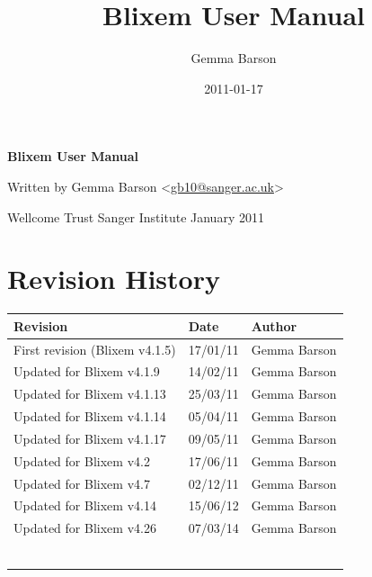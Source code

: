 \documentclass[letterpaper]{article}
\title{Blixem User Manual}
\author{Gemma Barson}
\date{2011-01-17}
\begin{document}
\setcounter{page}{1}\pagestyle{Standard}


\thispagestyle{FirstPage}
{\centering\sffamily\bfseries\color[rgb]{0.0,0.27058825,0.5254902}
\Huge\bf{Blixem User Manual}}

\bigskip

{\centering
\large{Written by Gemma Barson}}
{\centering
{\textless}\href{mailto:gb10@sanger.ac.uk}{gb10@sanger.ac.uk}{\textgreater}}

\bigskip

{\centering
\large{Wellcome Trust Sanger Institute}}
{ January 2011}



\clearpage
{\color[rgb]{0.0,0.27058825,0.5254902}\section[Revision History]{Revision History}}
\hypertarget{RefHeading334316266717}{}

\begin{center}
\tablehead{}
\begin{supertabular}{|m{8.073cm}|m{3.2849998cm}|m{3.282cm}|}
\hline
\bfseries Revision &
\bfseries Date &
\bfseries Author\\\hline
 First revision (Blixem v4.1.5) &
 17/01/11 &
 Gemma Barson\\\hline
 Updated for Blixem v4.1.9 &
 14/02/11 &
 Gemma Barson\\\hline
 Updated for Blixem v4.1.13 &
 25/03/11 &
 Gemma Barson\\\hline
 Updated for Blixem v4.1.14 &
 05/04/11 &
 Gemma Barson\\\hline
 Updated for Blixem v4.1.17 &
 09/05/11 &
 Gemma Barson\\\hline
 Updated for Blixem v4.2 &
 17/06/11 &
 Gemma Barson\\\hline
 Updated for Blixem v4.7 &
 02/12/11 &
 Gemma Barson\\\hline
 Updated for Blixem v4.14 &
 15/06/12 &
 Gemma Barson\\\hline
 Updated for Blixem v4.26  &
 07/03/14 &
 Gemma Barson\\\hline
 &
 &
 \\\hline
 &
 &
 \\\hline
 &
 &
 \\\hline
 &
 &
 \\\hline
 &
 &
 \\\hline
 &
 &
 \\\hline
\end{supertabular}
\end{center}
\end{document}
